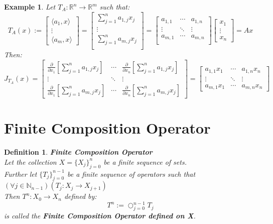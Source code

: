 \documentclass[12pt]{extarticle}
\theoremstyle{plain}
\theoremstyle{Definition}
\newtheorem{def.}{Definition}[section]
\theoremstyle{Definition}
\theoremstyle{plain}
\newtheorem{exmp}{Example}[section]
\begin{document}
\begin{exmp}
	Let $T_A : \mathbb{R}^n \to \mathbb{R}^m$ such that:
	\[
	T_A(x) := 
	\begin{bmatrix}
	\langle a_1 , x \rangle \\
	\vdots \\
	\langle a_m , x \rangle
	\end{bmatrix}
	=
	\begin{bmatrix}
	\sum_{j=1}^{n} a_{1,j}x_j \\ 
	\vdots \\ 
	\sum_{j=1}^{n} a_{m,j}x_j \\ 	
	\end{bmatrix}
	= 
	\begin{bmatrix}
	a_{1,1} & \cdots & a_{1,n} \\ 
	\vdots & \ddots & \vdots \\ 
	a_{m,1} & \cdots & a_{m,n} \\ 	
	\end{bmatrix}
	\begin{bmatrix}
	x_1 \\ 
	\vdots \\ 
	x_n
	\end{bmatrix}
	= Ax
	\]
	Then: 
	\[
	J_{T_A}(x) = 
	\begin{bmatrix} 
	\frac{\partial }{\partial x_1}\left[\sum_{j=1}^{n} a_{1,j}x_j\right] & \cdots & \frac{\partial }{\partial x_n}\left[\sum_{j=1}^{n} a_{1,j}x_j\right] \\
	\vdots & \ddots & \vdots \\ 
	\frac{\partial }{\partial x_1}\left[\sum_{j=1}^{n} a_{m,j}x_j\right]& \cdots & \frac{\partial }{\partial x_n}\left[\sum_{j=1}^{n} a_{m,j}x_j\right] 
	\end{bmatrix}
	= 
	\begin{bmatrix} 
	a_{1,1}x_1 & \cdots & a_{1,n}x_n \\
	\vdots & \ddots & \vdots \\ 
	a_{m,1}x_1 & \cdots & a_{m,n}x_n 
	\end{bmatrix}		
	\] 
\end{exmp}

\section{Finite Composition Operator}
\begin{def.} \textbf{Finite Composition Operator} \\ 
	Let the collection $X = \{X_j\}_{j=0}^{n}$ be a finite sequence of sets. \\ 
	Further let $\{T_j\}_{j=0}^{n-1}$ be a finite sequence of operators such that $(\forall j \in \mathbb{N}_{n-1})(T_j : X_j \to X_{j+1})$ \\ 
	Then $T^n : X_0 \to X_{n}$ defined by: 
	$$T^n := \bigcirc_{j=0}^{n-1} T_j$$ 
	is called the \textbf{Finite Composition Operator defined on X}. \\ 
\end{def.}
\end{document}
